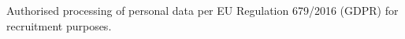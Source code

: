 
\begin{cvskills}

        \cvskill
        {}
        {Authorised processing of personal data per EU Regulation 679/2016 (GDPR) for recruitment purposes.}

\end{cvskills}